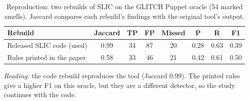 \begin{table}[t]\centering\caption{Reproduction: two rebuilds of SLIC on the GLITCH Puppet oracle (54 marked smells). Jaccard compares each rebuild's findings with the original tool's output.}\label{tab:repro}
\scriptsize\setlength{\tabcolsep}{3pt}\begin{tabular}{lccccccc}\toprule
Rebuild & Jaccard & TP & FP & Missed & P & R & F1 \\ \midrule
Released SLIC code (used) & 0.99 & 34 & 87 & 20 & 0.28 & 0.63 & 0.39 \\
Rules printed in the paper & 0.58 & 33 & 46 & 21 & 0.42 & 0.61 & 0.50 \\
\bottomrule\end{tabular}
\par\vspace{3pt}\parbox{\linewidth}{\footnotesize\emph{Reading:} the code rebuild reproduces the tool (Jaccard 0.99). The printed rules give a higher F1 on this oracle, but they are a different detector, so the study continues with the code.}
\end{table}